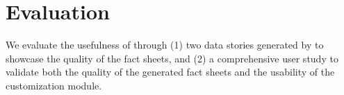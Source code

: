 \section{Evaluation}

We evaluate the usefulness of \tool through (1) two data stories generated by \tool to showcase the quality of the fact sheets, and (2) a comprehensive user study to validate both the quality of the generated fact sheets and the usability of the customization module.






 



